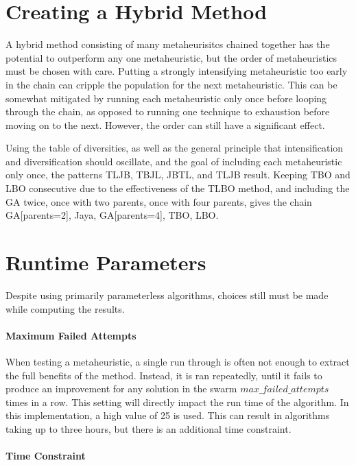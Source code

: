 \documentclass[11pt, letterpaper, onecolumn]{article}
\begin{document}
\section{Creating a Hybrid Method}

A hybrid method consisting of many metaheurisitcs chained together has the potential to outperform any one metaheuristic, but the order of metaheuristics must be chosen with care. Putting a strongly intensifying metaheuristic too early in the chain can cripple the population for the next metaheuristic. This can be somewhat mitigated by running each metaheuristic only once before looping through the chain, as opposed to running one technique to exhaustion before moving on to the next. However, the order can still have a significant effect. 

Using the table of diversities, as well as the general principle that intensification and diversification should oscillate, and the goal of including each metaheuristic only once, the patterns TLJB, TBJL, JBTL, and TLJB result. Keeping TBO and LBO consecutive due to the effectiveness of the TLBO method, and including the GA twice, once with two parents, once with four parents, gives the chain GA[parents=2], Jaya, GA[parents=4], TBO, LBO.  


\section{Runtime Parameters}

Despite using primarily parameterless algorithms, choices still must be made while computing the results. 

\paragraph{Maximum Failed Attempts}

When testing a metaheuristic, a single run through is often not enough to extract the full benefits of the method. Instead, it is ran repeatedly, until it fails to produce an improvement for any solution in the swarm $max\_failed\_attempts$ times in a row. This setting will directly impact the run time of the algorithm. In this implementation, a high value of 25 is used. This can result in algorithms taking up to three hours, but there is an additional time constraint. 

\paragraph{Time Constraint}
\end{document}
